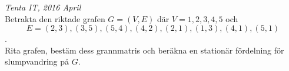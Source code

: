{\it Tenta IT, 2016 April}\\
Betrakta den riktade grafen $G=(V,E)$ där $V={1,2,3,4,5}$ och\\
$$E={(2,3),(3,5),(5,4),(4,2),(2,1),(1,3),(4,1),(5,1)}$$.\\
Rita grafen, bestäm dess grannmatris och beräkna en stationär fördelning för slumpvandring på $G$.